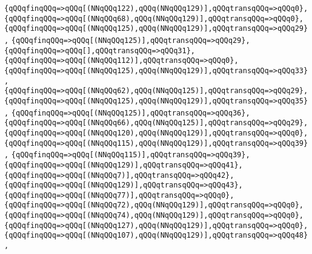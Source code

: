 \verb|{qQQqfinqQQq=>qQQq[(NNqQQq122),qQQq(NNqQQq129)],qQQqtransqQQq=>qQQq0},|\newline
\verb|{qQQqfinqQQq=>qQQq[(NNqQQq68),qQQq(NNqQQq129)],qQQqtransqQQq=>qQQq0},|\newline
\verb|{qQQqfinqQQq=>qQQq[(NNqQQq125),qQQq(NNqQQq129)],qQQqtransqQQq=>qQQq29},|\newline
\verb|{qQQqfinqQQq=>qQQq[(NNqQQq125)],qQQqtransqQQq=>qQQq29},|\newline
\verb|{qQQqfinqQQq=>qQQq[],qQQqtransqQQq=>qQQq31},|\newline
\verb|{qQQqfinqQQq=>qQQq[(NNqQQq112)],qQQqtransqQQq=>qQQq0},|\newline
\verb|{qQQqfinqQQq=>qQQq[(NNqQQq125),qQQq(NNqQQq129)],qQQqtransqQQq=>qQQq33},|\newline
\verb|{qQQqfinqQQq=>qQQq[(NNqQQq62),qQQq(NNqQQq125)],qQQqtransqQQq=>qQQq29},|\newline
\verb|{qQQqfinqQQq=>qQQq[(NNqQQq125),qQQq(NNqQQq129)],qQQqtransqQQq=>qQQq35},|\newline
\verb|{qQQqfinqQQq=>qQQq[(NNqQQq125)],qQQqtransqQQq=>qQQq36},|\newline
\verb|{qQQqfinqQQq=>qQQq[(NNqQQq66),qQQq(NNqQQq125)],qQQqtransqQQq=>qQQq29},|\newline
\verb|{qQQqfinqQQq=>qQQq[(NNqQQq120),qQQq(NNqQQq129)],qQQqtransqQQq=>qQQq0},|\newline
\verb|{qQQqfinqQQq=>qQQq[(NNqQQq115),qQQq(NNqQQq129)],qQQqtransqQQq=>qQQq39},|\newline
\verb|{qQQqfinqQQq=>qQQq[(NNqQQq115)],qQQqtransqQQq=>qQQq39},|\newline
\verb|{qQQqfinqQQq=>qQQq[(NNqQQq129)],qQQqtransqQQq=>qQQq41},|\newline
\verb|{qQQqfinqQQq=>qQQq[(NNqQQq7)],qQQqtransqQQq=>qQQq42},|\newline
\verb|{qQQqfinqQQq=>qQQq[(NNqQQq129)],qQQqtransqQQq=>qQQq43},|\newline
\verb|{qQQqfinqQQq=>qQQq[(NNqQQq77)],qQQqtransqQQq=>qQQq0},|\newline
\verb|{qQQqfinqQQq=>qQQq[(NNqQQq72),qQQq(NNqQQq129)],qQQqtransqQQq=>qQQq0},|\newline
\verb|{qQQqfinqQQq=>qQQq[(NNqQQq74),qQQq(NNqQQq129)],qQQqtransqQQq=>qQQq0},|\newline
\verb|{qQQqfinqQQq=>qQQq[(NNqQQq127),qQQq(NNqQQq129)],qQQqtransqQQq=>qQQq0},|\newline
\verb|{qQQqfinqQQq=>qQQq[(NNqQQq107),qQQq(NNqQQq129)],qQQqtransqQQq=>qQQq48},|\newline
